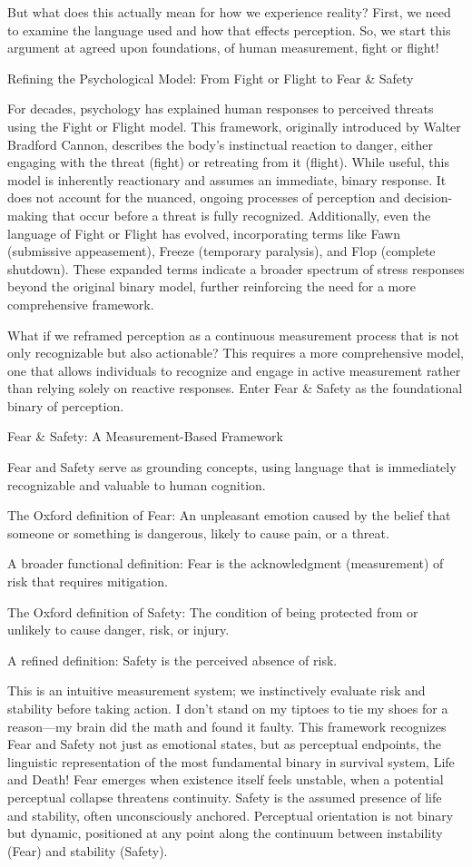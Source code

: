 \documentclass[11pt]{article}
\begin{document}
But what does this actually mean for how we experience reality? First, we need to examine the language used and how that effects perception. So, we start this argument at agreed upon foundations, of human measurement, fight or flight!

Refining the Psychological Model: From Fight or Flight to Fear & Safety

For decades, psychology has explained human responses to perceived threats using the Fight or Flight model. This framework, originally introduced by Walter Bradford Cannon, describes the body's instinctual reaction to danger, either engaging with the threat (fight) or retreating from it (flight). While useful, this model is inherently reactionary and assumes an immediate, binary response. It does not account for the nuanced, ongoing processes of perception and decision-making that occur before a threat is fully recognized. Additionally, even the language of Fight or Flight has evolved, incorporating terms like Fawn (submissive appeasement), Freeze (temporary paralysis), and Flop (complete shutdown). These expanded terms indicate a broader spectrum of stress responses beyond the original binary model, further reinforcing the need for a more comprehensive framework.

What if we reframed perception as a continuous measurement process that is not only recognizable but also actionable? This requires a more comprehensive model, one that allows individuals to recognize and engage in active measurement rather than relying solely on reactive responses. Enter Fear & Safety as the foundational binary of perception.

Fear & Safety: A Measurement-Based Framework

Fear and Safety serve as grounding concepts, using language that is immediately recognizable and valuable to human cognition.

The Oxford definition of Fear: An unpleasant emotion caused by the belief that someone or something is dangerous, likely to cause pain, or a threat.

A broader functional definition: Fear is the acknowledgment (measurement) of risk that requires mitigation.

The Oxford definition of Safety: The condition of being protected from or unlikely to cause danger, risk, or injury.

A refined definition: Safety is the perceived absence of risk.

This is an intuitive measurement system; we instinctively evaluate risk and stability before taking action. I don’t stand on my tiptoes to tie my shoes for a reason—my brain did the math and found it faulty. This framework recognizes Fear and Safety not just as emotional states, but as perceptual endpoints, the linguistic representation of the most fundamental binary in survival system, Life and Death! Fear emerges when existence itself feels unstable, when a potential perceptual collapse threatens continuity. Safety is the assumed presence of life and stability, often unconsciously anchored. Perceptual orientation is not binary but dynamic, positioned at any point along the continuum between instability (Fear) and stability (Safety).
\end{document}
